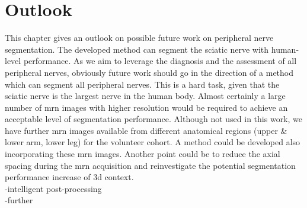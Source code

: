 \chapter{Outlook} \label{chap:outlook}
This chapter gives an outlook on possible future work on peripheral nerve segmentation.
The developed method can segment the sciatic nerve with human-level performance. As we aim to leverage the diagnosis and the assessment of all peripheral nerves, obviously future work should go in the direction of a method which can segment all peripheral nerves. This is a hard task, given that the sciatic nerve is the largest nerve in the human body. Almost certainly a large number of \gls{mrn} images with higher resolution would be required to achieve an acceptable level of segmentation performance.
Although not used in this work, we have further \gls{mrn} images available from different anatomical regions (upper \& lower arm, lower leg) for the volunteer cohort. A method could be developed also incorporating these \gls{mrn} images.
Another point could be to reduce the axial spacing during the \gls{mrn} acquisition and reinvestigate the potential segmentation performance increase of \gls{3d} context.\\

-intelligent post-processing\\
-further

\endinput